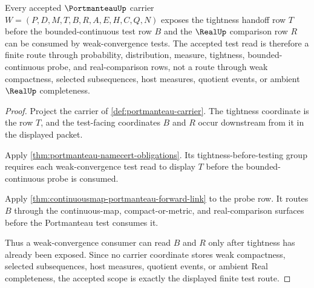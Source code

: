 \begin{theorem}
\label{thm:portmanteau-tight-test-scope}
Every accepted $\PortmanteauUp$ carrier $W=(P,D,M,T,B,R,A,E,H,C,Q,N)$ exposes the tightness handoff row $T$ before the bounded-continuous test row $B$ and the $\RealUp$ comparison row $R$ can be consumed by weak-convergence tests. The accepted test read is therefore a finite route through probability, distribution, measure, tightness, bounded-continuous probe, and real-comparison rows, not a route through weak compactness, selected subsequences, host measures, quotient events, or ambient $\RealUp$ completeness.
\end{theorem}
\begin{proof}
Project the carrier of \autoref{def:portmanteau-carrier}. The tightness coordinate is the row $T$, and the test-facing coordinates $B$ and $R$ occur downstream from it in the displayed packet.

Apply \autoref{thm:portmanteau-namecert-obligations}. Its tightness-before-testing group requires each weak-convergence test read to display $T$ before the bounded-continuous probe is consumed.

Apply \autoref{thm:continuousmap-portmanteau-forward-link} to the probe row. It routes $B$ through the continuous-map, compact-or-metric, and real-comparison surfaces before the Portmanteau test consumes it.

Thus a weak-convergence consumer can read $B$ and $R$ only after tightness has already been exposed. Since no carrier coordinate stores weak compactness, selected subsequences, host measures, quotient events, or ambient Real completeness, the accepted scope is exactly the displayed finite test route.
\end{proof}

